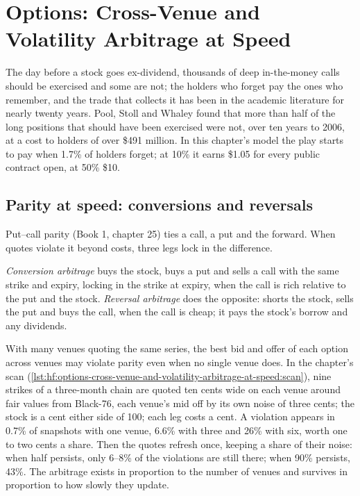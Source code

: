 \chapter{Options: Cross-Venue and Volatility Arbitrage at Speed}\label{ch:hf:options-cross-venue-and-volatility-arbitrage-at-speed}

The day before a stock goes ex-dividend, thousands of deep in-the-money calls should be exercised and some are not; the holders who forget pay the
ones who remember, and the trade that collects it has been in the academic literature for nearly twenty years. Pool, Stoll and Whaley found
that more than half of the long positions that should have been exercised were not, over ten years to 2006, at a cost to holders of over \$491
million. In this chapter's model the play starts to pay when 1.7\% of holders forget; at 10\% it earns \$1.05 for every public contract open,
at 50\% \$10.

\section{Parity at speed: conversions and reversals}

Put--call parity (Book 1, chapter 25) ties a call, a put and the forward. When quotes violate it beyond costs, three legs lock in the difference.

\begin{definition}\label{def:hf:options-cross-venue-and-volatility-arbitrage-at-speed:conversion}
\emph{Conversion arbitrage} buys the stock, buys a put and sells a call with the same strike and expiry, locking in the
strike at expiry, when the call is rich relative to the put and the stock. \emph{Reversal arbitrage} does the opposite:
shorts the stock, sells the put and buys the call, when the call is cheap; it pays the stock's borrow and any dividends.
\end{definition}

With many venues quoting the same series, the best bid and offer of each option across venues may violate parity even when no single venue does.
In the chapter's scan (\cref{lst:hf:options-cross-venue-and-volatility-arbitrage-at-speed:scan}), nine strikes of a three-month chain are quoted ten
cents wide on each venue around fair values from Black-76, each venue's mid off by its own noise of three cents; the stock is a cent either side of
100; each leg costs a cent. A violation appears in 0.7\% of snapshots with one venue, 6.6\% with three and 26\% with six, worth one to two cents a
share. Then the quotes refresh once, keeping a share of their noise: when half persists, only 6--8\% of the violations are still there; when 90\%
persists, 43\%. The arbitrage exists in proportion to the number of venues and survives in proportion to how slowly they update.

